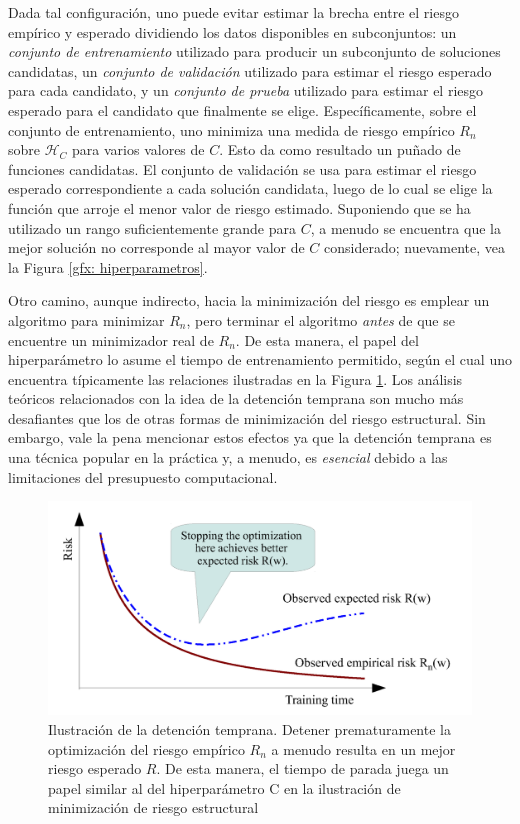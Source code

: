 Dada tal configuraci\'on, uno puede evitar estimar la brecha entre el riesgo emp\'irico y esperado dividiendo los datos disponibles en subconjuntos: un \textit{conjunto de entrenamiento} utilizado para producir un subconjunto de soluciones candidatas, un \textit{conjunto de validaci\'on} utilizado para estimar el riesgo esperado para cada candidato, y un \textit{conjunto de prueba} utilizado para estimar el riesgo esperado para el candidato que finalmente se elige. Espec\'ificamente, sobre el conjunto de entrenamiento, uno minimiza una medida de riesgo emp\'irico $R_n$ sobre $\mathcal{H}_C$ para varios valores de $C$. Esto da como resultado un pu\~nado de funciones candidatas. El conjunto de validaci\'on se usa para estimar el riesgo esperado correspondiente a cada soluci\'on candidata, luego de lo cual se elige la funci\'on que arroje el menor valor de riesgo estimado. Suponiendo que se ha utilizado un rango suficientemente grande para $C$, a menudo se encuentra que la mejor soluci\'on no corresponde al mayor valor de $C$ considerado; nuevamente, vea la Figura \ref{gfx: hiperparametros}.


Otro camino, aunque indirecto, hacia la minimizaci\'on del riesgo es emplear un algoritmo para minimizar $R_n$, pero terminar el algoritmo \textit{antes} de que se encuentre un minimizador real de $R_n$. De esta manera, el papel del hiperpar\'ametro lo asume el tiempo de entrenamiento permitido, seg\'un el cual uno encuentra t\'ipicamente las relaciones ilustradas en la Figura \ref{gfx: stopping}. Los an\'alisis te\'oricos relacionados con la idea de la detenci\'on temprana son mucho m\'as desafiantes que los de otras formas de minimizaci\'on del riesgo estructural. Sin embargo, vale la pena mencionar estos efectos ya que la detenci\'on temprana es una t\'ecnica popular en la pr\'actica y, a menudo, es \textit{esencial} debido a las limitaciones del presupuesto computacional.


\begin{figure}[h]
	\label{gfx: stopping}
	\centering
	\includegraphics[scale=.3]{gfx/stopping.png}
	\caption{Ilustraci\'on de la detenci\'on temprana. Detener prematuramente la optimizaci\'on del riesgo emp\'irico $R_n$ a menudo resulta en un mejor riesgo esperado $R$. De esta manera, el tiempo de parada juega un papel similar al del hiperpar\'ametro C en la ilustraci\'on de minimizaci\'on de riesgo estructural}
\end{figure}


